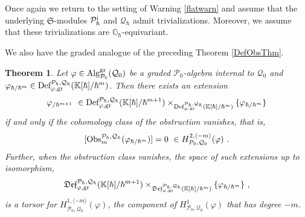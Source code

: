 \documentclass[11pt]{amsart}
\numberwithin{equation}{section}
\newtheorem{theo}{Theorem}[section]
\theoremstyle{definition}
\newcommand{\bb}{\mathbb}
\newcommand{\mc}{\mathcal}
\newcommand{\mf}{\mathfrak}
\newcommand{\Def}{{\textup{Def}}}
\newcommand{\fDef}{{\mathfrak{Def}}}
\newcommand{\Ph}{{\mathcal{P}_\hbar}}
\newcommand{\Qh}{{\mathcal{Q}_\hbar}}
\newcommand{\gd}{{\textup{gr}}}
\newcommand{\K}{{\bb K}}
\newcommand{\Obs}{{\textup{Obs}}}
\newcommand{\Alg}{{\textup{Alg}}}
\newcommand{\ash}{{\textup{\mbox{!`}}}}
\newcommand{\Ss}{{{\mf{S}}}}
\newcommand{\0}{{\textbf{0}}}
\def\IG{\mathbb{G}}
\def\PP{{\mc P}}
\def\QQ{{\mc Q}}
\def \mf{\mathfrak}
\begin{document}
Once again we return to the setting of Warning \ref{flatwarn} and assume that the underlying $\Ss$-modules $\PP_\hbar^\ash$ and $\QQ_\hbar$ admit trivializations. Moreover, we assume that these trivializations are $\IG_\hbar$-equivariant.

We also have the graded analogue of the preceding Theorem \ref{DefObsThm}.

\begin{theo}\label{DefObsgrThm} Let $\varphi\in \Alg_{\mc P_0}^\gd(\mc Q_0)$ be a graded $\mc P_0$-algebra internal to $\mc Q_0$ and $\varphi_{\hbar/\hbar^{m}}\in \Def^{\Ph,\Qh}_{\varphi,\gd}(\K[\hbar]/\hbar^{m}) $. Then there exists an extension
	\[ \varphi_{ / \hbar^{m+1}} \  \in \Def^{\Ph,\Qh}_{\varphi,\gd}(\K[\hbar]/\hbar^{m+1}) \times_{\Def^{\Ph,\Qh}_{\varphi,\gd}(\K[\hbar]/\hbar^{m}) } \{\varphi_{\hbar/\hbar^{m}} \}\]
	if and only if the cohomology class of the obstruction vanishes, that is,
	\[ [ \Obs^{\Ph,\Qh}_m(\varphi_{\hbar/\hbar^{m}})]= 0 \ \in H^{2,\langle -m \rangle}_{\mc P_0,\mc Q_0}(\varphi) \ .\]
	Further, when the obstruction class vanishes, the space of such extensions up to isomorphism,
	\[  \fDef^{\Ph,\Qh}_{\varphi,\gd}(\K[\hbar]/\hbar^{m+1}) \times_{\fDef^{\Ph,\Qh}_{\varphi,\gd}(\K[\hbar]/\hbar^{m}) } \{\varphi_{\hbar/\hbar^{m}} \} \ , \]
	is a torsor for $H^{1,\langle -m \rangle}_{\mc P_0,\mc Q_0}(\varphi)$, the component of $H^1_{\mc P_0,\mc Q_0}(\varphi)$ that has degree $-m$.
\end{theo}
\end{document}
